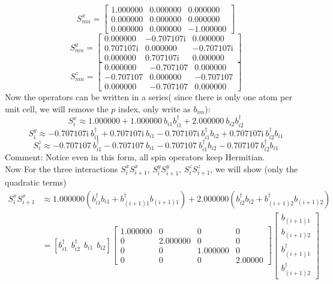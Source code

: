 \documentclass[letter]{article}
\newcommand{\ii}{\mathrm{i}}
\begin{document}
$$S^x_{mn}=\begin{bmatrix}
    1.000000 & 0.000000 & 0.000000 \\
    0.000000 &  0.000000 & 0.000000 \\
    0.000000 &  0.000000 & -1.000000
    \end{bmatrix}$$$$
S^y_{mn}=\begin{bmatrix}
        0.000000 & -0.707107\ii & 0.000000 \\
       0.707107\ii &  0.000000 & -0.707107\ii\\
        0.000000 &  0.707107\ii & 0.000000
        \end{bmatrix}$$ $$
S^z_{mn}=\begin{bmatrix}
0.000000 & -0.707107 & 0.000000 \\
-0.707107 &  0.000000 & -0.707107 \\
0.000000 &  -0.707107 & 0.000000
\end{bmatrix}
$$
Now the operators can be written in a series( since there is only one atom per unit cell, we will remove the $p$ index, only write as $b_{im}$):
$$
S_{i}^{x}\approx1.000000+1.000000\ b_{i1}b_{i1}^{\dagger}+2.000000\ b_{i2}b_{i2}^{\dagger}$$$$
S_{i}^{y}\approx-0.707107\ii\ b_{i1}^{\dagger}+0.707107\ii\ b_{i1}-0.707107\ii\ b_{i1}^{\dagger}b_{i2}+0.707107\ii\ b_{i2}^{\dagger}b_{i1}$$$$
S_{i}^{z}\approx-0.707107\ b_{i1}^{\dagger}-0.707107\ b_{i1}-0.707107\  b_{i1}^{\dagger}b_{i2}-0.707107\  b_{i2}^{\dagger}b_{i1}$$
\indent Comment: Notice even in this form, all spin operators keep Hermitian.\\
\indent Now For the three interactions $S_{i}^x S_{i+1}^x$, $S_{i}^y S_{i+1}^y$, $S_{i}^z S_{i+1}^z$, we will show (only the quadratic terms)
$$
\begin{aligned}
    S_{i}^x S_{i+1}^x &\approx1.000000\left(b_{i1}^{\dagger}b_{i1}+b_{(i+1)1}^{\dagger}b_{(i+1)1}\right)+2.000000\left(b_{i2}^{\dagger}b_{i2}+b_{(i+1)2}^{\dagger}b_{(i+1)2}\right)\\ &=\left[
        b_{i1}^{\dagger} \ \ 
        b_{i2}^{\dagger}\  \ 
        b_{i1}\ \ 
        b_{i2}\right]
       \begin{bmatrix}
            1.000000 & 0 & 0 & 0 \\
           0 &  2.000000 & 0 &0 \\
            0 &  0 & 1.000000 &0\\
            0 & 0 & 0& 2.00000
            \end{bmatrix}\begin{bmatrix}
                b_{(i+1)1}  \\
                b_{(i+1)2}  \\
                b_{(i+1)1}^{\dagger}\\
                b_{(i+1)2}^{\dagger}
                \end{bmatrix}
\end{aligned}
$$
\end{document}

